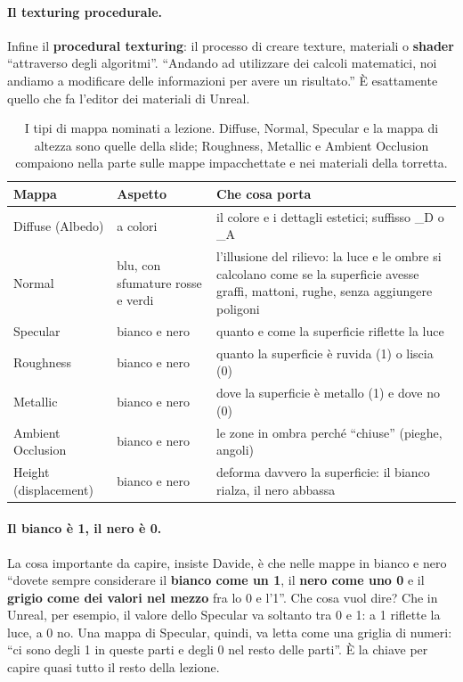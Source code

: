 \paragraph{Il texturing procedurale.} Infine il \textbf{procedural texturing}: il
processo di creare texture, materiali o \textbf{shader} ``attraverso degli
algoritmi''. ``Andando ad utilizzare dei calcoli matematici, noi andiamo a modificare
delle informazioni per avere un risultato.'' È esattamente quello che fa l'editor dei
materiali di Unreal.

\begin{table}[htbp]
\centering
\small
\begin{tabular}{@{}p{2.5cm}p{2.4cm}p{8.1cm}@{}}
\toprule
\textbf{Mappa} & \textbf{Aspetto} & \textbf{Che cosa porta} \\
\midrule
Diffuse (Albedo) & a colori & il colore e i dettagli estetici; suffisso \_D o \_A \\
Normal & blu, con sfumature rosse e verdi & l'illusione del rilievo: la luce e le
  ombre si calcolano come se la superficie avesse graffi, mattoni, rughe, senza
  aggiungere poligoni \\
Specular & bianco e nero & quanto e come la superficie riflette la luce \\
Roughness & bianco e nero & quanto la superficie è ruvida (1) o liscia (0) \\
Metallic & bianco e nero & dove la superficie è metallo (1) e dove no (0) \\
Ambient Occlusion & bianco e nero & le zone in ombra perché ``chiuse'' (pieghe,
  angoli) \\
Height (displacement) & bianco e nero & deforma davvero la superficie: il bianco
  rialza, il nero abbassa \\
\bottomrule
\end{tabular}
\caption{I tipi di mappa nominati a lezione. Diffuse, Normal, Specular e la mappa di
altezza sono quelle della slide; Roughness, Metallic e Ambient Occlusion compaiono
nella parte sulle mappe impacchettate e nei materiali della torretta.}
\label{ue3:tab:mappe}
\end{table}

\paragraph{Il bianco è 1, il nero è 0.} La cosa importante da capire, insiste Davide, è
che nelle mappe in bianco e nero ``dovete sempre considerare il \textbf{bianco come un
1}, il \textbf{nero come uno 0} e il \textbf{grigio come dei valori nel mezzo} fra lo 0 e
l'1''. Che cosa vuol dire? Che in Unreal, per esempio, il valore dello Specular va
soltanto tra 0 e 1: a 1 riflette la luce, a 0 no. Una mappa di Specular, quindi, va
letta come una griglia di numeri: ``ci sono degli 1 in queste parti e degli 0 nel resto
delle parti''. È la chiave per capire quasi tutto il resto della lezione.

